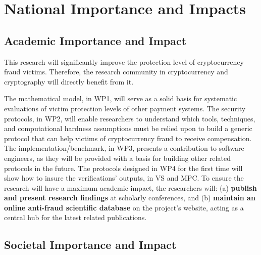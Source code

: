 

\section{National Importance and Impacts}

\subsection{Academic Importance and Impact}

This research will significantly improve the protection level of cryptocurrency fraud victims. Therefore, the research community in cryptocurrency and cryptography will directly benefit from it. 



The mathematical model, in WP1, will serve as a solid basis for systematic evaluations of victim protection levels of other payment systems. The security protocols, in WP2, will enable researchers to understand which tools, techniques, and computational hardness assumptions must be relied upon to build a generic protocol that can help victims of cryptocurrency fraud to receive compensation. The implementation/benchmark, in WP3, presents a contribution to software engineers, as they will be provided with a basis for building other related protocols in the future. The protocols designed in WP4 for the first time will show how to insure the verifications' outputs, in VS and MPC. To ensure the research will have a maximum academic impact, the researchers will: (a) \textbf{publish and present research findings} at scholarly conferences, and (b) \textbf{maintain an online anti-fraud scientific database} on the project's website, acting as a central hub for the latest related publications.%


\subsection{Societal Importance and Impact}


